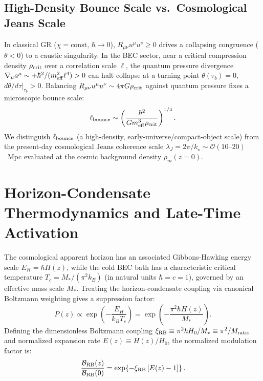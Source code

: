 \documentclass[preprint,12pt]{elsarticle}
\begin{document}
\subsection{High-Density Bounce Scale vs.\ Cosmological Jeans Scale}
In classical GR ($\chi=\mathrm{const}$, $\hbar\to 0$), $R_{\mu\nu}u^\mu u^\nu \ge 0$ drives a collapsing congruence ($\theta < 0$) to a caustic singularity. In the BEC sector, near a critical compression density $\rho_{\rm crit}$ over a correlation scale $\ell$, the quantum pressure divergence $\nabla_\mu a^\mu \sim +\hbar^2/(m_{\rm eff}^2 \ell^4) > 0$ can halt collapse at a turning point $\theta(\tau_b) = 0$, $d\theta/d\tau|_{\tau_b} > 0$. Balancing $R_{\mu\nu}u^\mu u^\nu \sim 4\pi G \rho_{\rm crit}$ against quantum pressure fixes a microscopic bounce scale:
\begin{equation}
    \ell_{\rm bounce} \sim \left(\frac{\hbar^2}{G m_{\rm eff}^3 \rho_{\rm crit}}\right)^{1/4}.
    \label{eq:bounce_scale}
\end{equation}
We distinguish $\ell_{\rm bounce}$ (a high-density, early-universe/compact-object scale) from the present-day cosmological Jeans coherence scale $\lambda_J = 2\pi/k_\star \sim \mathcal{O}(10\text{--}20)$~Mpc evaluated at the cosmic background density $\rho_m(z=0)$.

\section{Horizon-Condensate Thermodynamics and Late-Time Activation}
\label{sec:thermo}

The cosmological apparent horizon has an associated Gibbons-Hawking energy scale $E_H = \hbar H(z)$, while the cold BEC bath has a characteristic critical temperature $T_c = M_*/(\pi^2 k_B)$ (in natural units $\hbar = c = 1$), governed by an effective mass scale $M_*$. Treating the horizon-condensate coupling via canonical Boltzmann weighting gives a suppression factor:
\begin{equation}
    P(z) \propto \exp\!\left(-\frac{E_H}{k_B T_c}\right) = \exp\!\left(-\frac{\pi^2 \hbar H(z)}{M_*}\right).
    \label{eq:boltzmann}
\end{equation}
Defining the dimensionless Boltzmann coupling $\xi_{\rm RB} \equiv \pi^2 \hbar H_0 / M_* \equiv \pi^2 / M_{\rm ratio}$ and normalized expansion rate $E(z) \equiv H(z)/H_0$, the normalized modulation factor is:
\begin{equation}
    \frac{\mathcal{B}_{\rm RB}(z)}{\mathcal{B}_{\rm RB}(0)} = \exp\!\left\{-\xi_{\rm RB}\left[E(z)-1\right]\right\}.
    \label{eq:brb_norm}
\end{equation}
\end{document}
